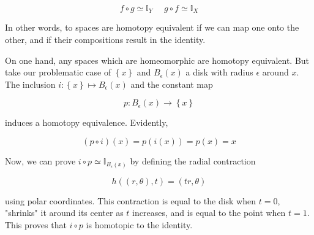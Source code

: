 \documentclass[a4paper, 12pt]{article}
\begin{document}
\begin{equation*}
    f\circ g \simeq \mathbb{I}_Y ~ ~ ~ ~ ~ ~ g \circ f \simeq \mathbb{I}_X
\end{equation*}

In other words, to spaces are homotopy equivalent if we can map one onto the other,
and if their compositions result in the identity.

On one hand, any spaces which are homeomorphic are homotopy equivalent. But 
take our problematic case of $\left\{ x \right\} $ and $B_\epsilon(x)$ a disk with 
radius $\epsilon$ around $x$. The inclusion $i : \left\{ x \right\} \mapsto B_{\epsilon}(x) $
and the constant map

\begin{equation*}
    p : B_\epsilon(x) \to  \left\{ x \right\} 
\end{equation*}

induces a homotopy equivalence. Evidently, 

\begin{equation*}
    ( p \circ i )(x) = p(i(x)) = p(x) = x
\end{equation*}

Now, we can prove $i \circ p \simeq \mathbb{I}_{ B_\epsilon(x) }$ by defining the radial contraction

\begin{equation*}
    h\left( (r, \theta), t \right) = (tr, \theta)
\end{equation*}

using polar coordinates. This contraction is equal to the disk when $t = 0$,
"shrinks" it around its center as $t$ increases, and is equal to the point when
$t = 1$. This proves that $i \circ p$ is homotopic to the identity. 
\end{document}
